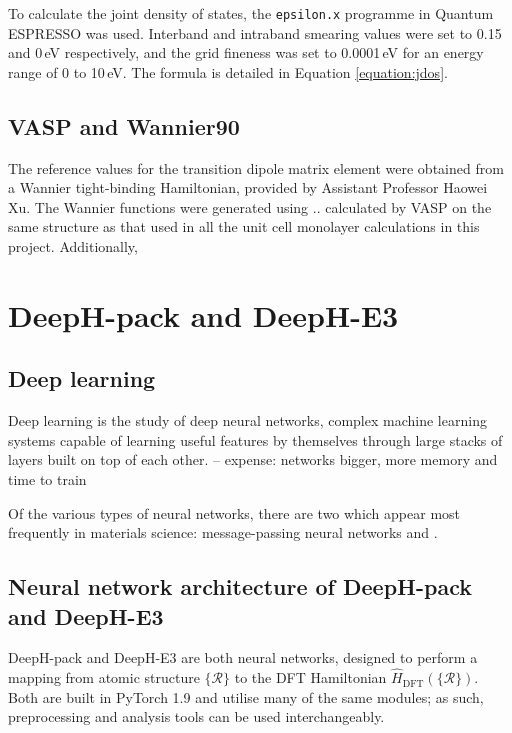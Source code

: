 \documentclass[11pt,a4paper,twoside]{report}  %
\numberwithin{equation}{section}					%
\numberwithin{figure}{section}						%
\begin{document}
To calculate the joint density of states, the \texttt{epsilon.x} programme in Quantum ESPRESSO was used. Interband and intraband smearing values were set to 0.15 and 0\,eV respectively, and the grid fineness was set to 0.0001\,eV for an energy range of 0 to 10\,eV. The formula is detailed in Equation \ref{equation:jdos}.

\subsection{VASP and Wannier90\autocite{MaximallyLocalizedWannier}}

The reference values for the transition dipole matrix element were obtained from a Wannier tight-binding Hamiltonian, provided by Assistant Professor Haowei Xu. The Wannier functions were generated using .. calculated by VASP on the same  structure as that used in all the unit cell monolayer calculations in this project. Additionally, 

\section{DeepH-pack and DeepH-E3}

\subsection{Deep learning}

Deep learning is the study of deep neural networks, complex machine learning systems capable of learning useful features by themselves through large stacks of layers built on top of each other. -- expense: networks bigger, more memory and time to train

Of the various types of neural networks, there are two which appear most frequently in materials science: message-passing neural networks and . 

\subsection{Neural network architecture of DeepH-pack and DeepH-E3}

DeepH-pack and DeepH-E3 are both neural networks, designed to perform a mapping from atomic structure $\{\mathcal R\}$ to the DFT Hamiltonian $\hat H_\text{DFT}(\{\mathcal R\})$\autocites{liDeeplearningDensityFunctional2022,gongGeneralFrameworkE3equivariant2023}. Both are built in PyTorch 1.9 and utilise many of the same modules; as such, preprocessing and analysis tools can be used interchangeably.
\end{document}
